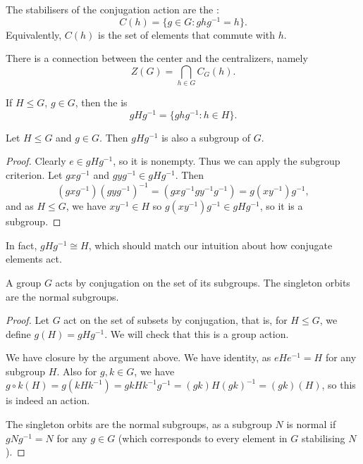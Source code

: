 \documentclass[a4paper]{scrartcl}
\begin{document}
\begin{definition}[centralizers]
	The stabilisers of the conjugation action are the :
	$$
C(h) = \{ g \in G : ghg^{-1} = h \}.
	$$
	Equivalently, $C(h)$ is the set of elements that commute with $h$.
\end{definition}

There is a connection between the center and the centralizers, namely
$$
Z(G) = \bigcap_{h \in G} C_G(h).
$$

\begin{definition}
	If $H \leq G$, $g \in G$, then the  is
	$$
	gHg^{-1} = \{g hg^{-1} : h \in H\}.
	$$
\end{definition}
\begin{proposition}
	Let $H \leq G$ and $g \in G$. Then $gHg^{-1}$ is also a subgroup of $G$.
\end{proposition}
\begin{proof}[Proof]
	Clearly $e \in gHg^{-1}$, so it is nonempty. Thus we can apply the subgroup criterion. 
	Let $gxg^{-1}$ and $gyg^{-1} \in gHg^{-1}$. Then
	$$
	(gxg^{-1})(gyg^{-1})^{-1} = (gxg^{-1}gy^{-1}g^{-1}) = g(xy^{-1})g^{-1},
	$$
	and as $H \leq G$, we have $xy^{-1} \in H$ so $g(xy^{-1})g^{-1} \in gHg^{-1}$, so it is a subgroup.
\end{proof}
In fact, $gHg^{-1} \cong H$, which should match our intuition about how conjugate elements act.



\begin{proposition}
	A group $G$ acts by conjugation on the set of its subgroups. The singleton orbits are the normal subgroups.
\end{proposition}
\begin{proof}
	Let $G$ act on the set of subsets by conjugation, that is, for $H \leq G$, we define $g(H) = gHg^{-1}$. We will check that this is a group action.
	
	We have closure by the argument above. We have identity, as $eHe^{-1} = H$ for any subgroup $H$. Also for $g, k \in G$, we have $g\circ k (H) = g(k H k^{-1}) = gk H k^{-1}g^{-1} = (gk)H(gk)^{-1} = (gk)(H)$, so this is indeed an action.

	The singleton orbits are the normal subgroups, as a subgroup $N$ is normal if $g N g^{-1} = N$ for any $g \in G$ (which corresponds to every element in $G$ stabilising $N$).
\end{proof}
\end{document}
